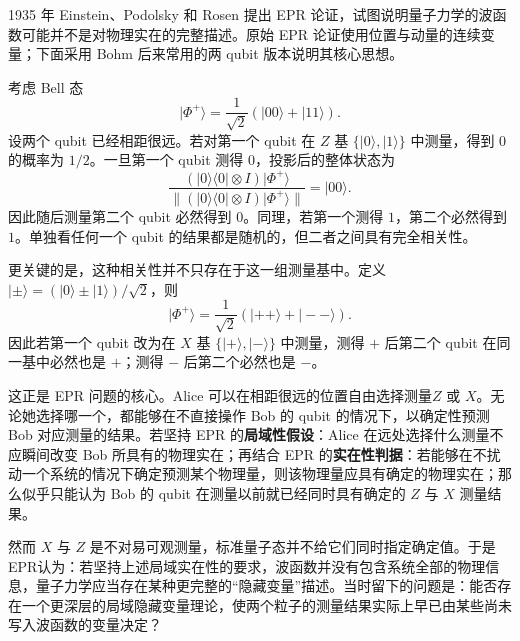 \documentclass[UTF8,a4paper,11pt,openany]{ctexbook}
\begin{document}
\begin{tcolorbox}[
    enhanced,breakable,
    colback=white,
    colframe=black!50,
    boxrule=0.7pt,
    arc=1mm,
    left=2mm,right=2mm,top=1.5mm,bottom=1.5mm,
    title={补充：EPR 佯谬、Bell 定理与纠缠的物理意义},
    fonttitle=\bfseries
]

1935 年 Einstein、Podolsky 和 Rosen 提出 EPR 论证，试图说明量子力学的波函数可能并不是对物理实在的完整描述。原始 EPR 论证使用位置与动量的连续变量；下面采用 Bohm 后来常用的两 qubit 版本说明其核心思想。

考虑 Bell 态
\begin{equation}
    |\Phi^+\rangle
    =
    \frac{1}{\sqrt2}
    \left(
        |00\rangle+|11\rangle
    \right).
\end{equation}
设两个 qubit 已经相距很远。若对第一个 qubit 在
$Z$ 基 $\{|0\rangle,|1\rangle\}$ 中测量，得到 $0$ 的概率为 $1/2$。一旦第一个 qubit 测得 $0$，投影后的整体状态为
\begin{equation}
    \frac{
        (|0\rangle\langle0|\otimes I)|\Phi^+\rangle
    }{
        \|
        (|0\rangle\langle0|\otimes I)|\Phi^+\rangle
        \|
    }
    =
    |00\rangle.
\end{equation}
因此随后测量第二个 qubit 必然得到 $0$。同理，若第一个测得 $1$，第二个必然得到 $1$。单独看任何一个 qubit 的结果都是随机的，但二者之间具有完全相关性。

更关键的是，这种相关性并不只存在于这一组测量基中。定义
$|\pm\rangle=(|0\rangle\pm|1\rangle)/\sqrt2$，则
\begin{equation}
    |\Phi^+\rangle
    =
    \frac{1}{\sqrt2}
    \left(
        |++\rangle+|--\rangle
    \right).
\end{equation}
因此若第一个 qubit 改为在 $X$ 基 $\{|+\rangle,|-\rangle\}$ 中测量，测得 $+$ 后第二个 qubit 在同一基中必然也是 $+$；测得 $-$ 后第二个必然也是 $-$。

这正是 EPR 问题的核心。Alice 可以在相距很远的位置自由选择测量$Z$ 或 $X$。无论她选择哪一个，都能够在不直接操作 Bob 的 qubit 的情况下，以确定性预测 Bob 对应测量的结果。若坚持 EPR 的\textbf{局域性假设}：Alice 在远处选择什么测量不应瞬间改变 Bob 所具有的物理实在；再结合 EPR 的\textbf{实在性判据}：若能够在不扰动一个系统的情况下确定预测某个物理量，则该物理量应具有确定的物理实在；那么似乎只能认为 Bob 的 qubit 在测量以前就已经同时具有确定的
$Z$ 与 $X$ 测量结果。

然而 $X$ 与 $Z$ 是不对易可观测量，标准量子态并不给它们同时指定确定值。于是EPR认为：若坚持上述局域实在性的要求，波函数并没有包含系统全部的物理信息，量子力学应当存在某种更完整的“隐藏变量”描述。当时留下的问题是：能否存在一个更深层的局域隐藏变量理论，使两个粒子的测量结果实际上早已由某些尚未写入波函数的变量决定？


\end{tcolorbox}
\end{document}

